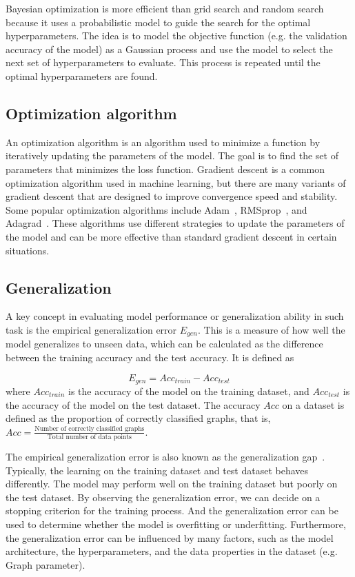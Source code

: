 Bayesian optimization is more efficient than grid search and random search because it uses a probabilistic model to guide the search for the optimal hyperparameters. The idea is to model the objective function (e.g. the validation accuracy of the model) as a Gaussian process and use the model to select the next set of hyperparameters to evaluate. This process is repeated until the optimal hyperparameters are found.

\subsection{Optimization algorithm}
An optimization algorithm is an algorithm used to minimize a function by iteratively updating the parameters of the model. The goal is to find the set of parameters that minimizes the loss function. Gradient descent is a common optimization algorithm used in machine learning, but there are many variants of gradient descent that are designed to improve convergence speed and stability. Some popular optimization algorithms include Adam~\cite{kingma2014adam}, RMSprop~\cite{graves2013generating}, and Adagrad~\cite{duchi2011adaptive}. These algorithms use different strategies to update the parameters of the model and can be more effective than standard gradient descent in certain situations. 

\subsection{Generalization}
A key concept in evaluating model performance or generalization ability in such task is the empirical generalization error $E_{gen}$. This is a measure of how well the model generalizes to unseen data, which can be calculated as the difference between the training accuracy and the test accuracy. It is defined as

$$
    E_{gen} = {Acc_{train}} - {Acc_{test}}
$$
where $Acc_{train}$ is the accuracy of the model on the training dataset, and $Acc_{test}$ is the accuracy of the model on the test dataset. The accuracy $Acc$ on a dataset is defined as the proportion of correctly classified graphs, that is, $Acc = \frac{\textrm{Number of correctly classified graphs}}{\textrm{Total number of data points}}$.

The empirical generalization error is also known as the generalization gap~\cite{goodfellow2016deep}. Typically, the learning on the training dataset and test dataset behaves differently. The model may perform well on the training dataset but poorly on the test dataset. By observing the generalization error, we can decide on a stopping criterion for the training process. And the generalization error can be used to determine whether the model is overfitting or underfitting. Furthermore, the generalization error can be influenced by many factors, such as the model architecture, the hyperparameters, and the data properties in the dataset (e.g. Graph parameter). 

